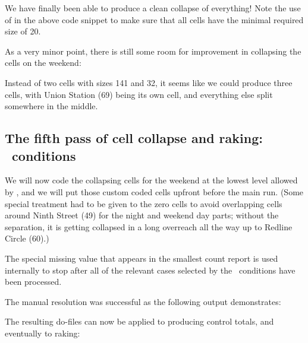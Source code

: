 \begin{stlog}
\nullskip
\end{stlog}

We have finally been able to produce a clean collapse of everything! Note the use of
 in the above code snippet to make sure that all cells have
the minimal required size of 20.

As a very minor point, there is still some room for improvement in collapsing the cells on the weekend:

\begin{stlog}
\nullskip
\end{stlog}

Instead of two cells with sizes 141 and 32, it seems like we could produce three cells, with
Union Station (69) being its own cell, and everything else split somewhere in the middle.

\subsection{The fifth pass of cell collapse and raking: \ifexp\ conditions}

We will now code the collapsing cells for the weekend at the lowest level
allowed by , and we will put those
custom coded cells upfront before the main run. (Some special treatment had to be given
to the zero cells to avoid overlapping cells around Ninth Street (49) for the night and weekend
day parts; without the separation, it is getting collapsed in a long overreach all the way up to
Redline Circle (60).)

\begin{stlog}
\nullskip
\end{stlog}

The special missing value  that appears in the smallest count report is
used internally to stop  after all of the relevant cases
selected by the \ifexp\ conditions have been processed.

The manual resolution was successful as the following output demonstrates:

\begin{stlog}
\nullskip
\end{stlog}

The resulting do-files can now be applied to producing control totals, and eventually to raking:

